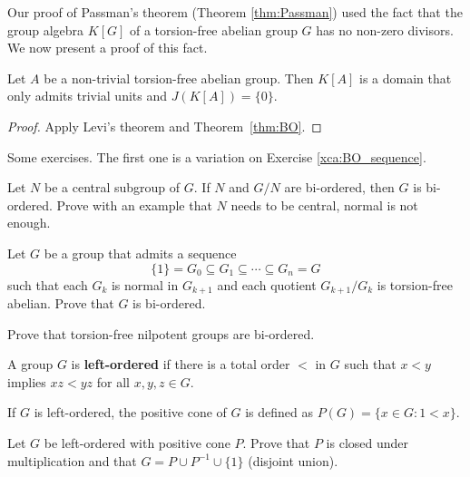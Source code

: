 Our proof of Passman's theorem (Theorem \ref{thm:Passman}) 
used the fact that the group algebra $K[G]$ of
a torsion-free abelian group $G$ has no non-zero divisors. 
We now present a proof of this fact. 

\begin{corollary}
\label{cor:domain_G_abelian}
	Let $A$ be a non-trivial torsion-free abelian group. Then $K[A]$ 
	is a domain that only admits trivial units and $J(K[A])=\{0\}$. 
\end{corollary}

\begin{proof}
	Apply Levi's theorem and Theorem~\ref{thm:BO}.
\end{proof}

Some exercises. The first one is a variation on Exercise \ref{xca:BO_sequence}.

\begin{exercise}
    Let $N$ be a central subgroup of $G$. If $N$ and $G/N$ are bi-ordered, 
    then $G$ is bi-ordered. Prove with an example that $N$ needs to be central, normal 
    is not enough. 
\end{exercise}

\begin{exercise}
    Let $G$ be a group that admits 
    a sequence 
    \[
    \{1\}=G_0\subseteq G_1\subseteq\cdots\subseteq G_n=G
    \]
    such that
    each $G_k$ is normal in $G_{k+1}$ and each quotient $G_{k+1}/G_k$ is 
    torsion-free abelian. Prove that $G$ is bi-ordered.  
\end{exercise}

\begin{exercise}
    Prove that torsion-free nilpotent groups are bi-ordered. 
\end{exercise}



\begin{definition}
	A group $G$ is \textbf{left-ordered} if there is a total order 
	$<$ in $G$ such that $x<y$ implies $xz<yz$ for all $x,y,z\in G$.
\end{definition}

If $G$ is left-ordered, the positive cone of $G$ is defined as $P(G)=\{x\in G:1<x\}$. 

\begin{exercise}
	Let $G$ be left-ordered with positive cone $P$. Prove that 
	$P$ is closed under multiplication and that 
	$G=P\cup P^{-1}\cup \{1\}$ (disjoint union).
\end{exercise}

